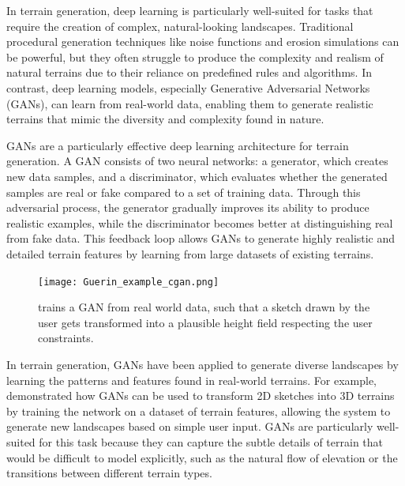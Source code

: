 

In terrain generation, deep learning is particularly well-suited for tasks that require the creation of complex, natural-looking landscapes. Traditional procedural generation techniques like noise functions and erosion simulations can be powerful, but they often struggle to produce the complexity and realism of natural terrains due to their reliance on predefined rules and algorithms. In contrast, deep learning models, especially Generative Adversarial Networks (GANs), can learn from real-world data, enabling them to generate realistic terrains that mimic the diversity and complexity found in nature.

GANs are a particularly effective deep learning architecture for terrain generation. A GAN consists of two neural networks: a generator, which creates new data samples, and a discriminator, which evaluates whether the generated samples are real or fake compared to a set of training data. Through this adversarial process, the generator gradually improves its ability to produce realistic examples, while the discriminator becomes better at distinguishing real from fake data. This feedback loop allows GANs to generate highly realistic and detailed terrain features by learning from large datasets of existing terrains.

\begin{figure}
    \texttt{[image: Guerin\_example\_cgan.png]}
    \caption{\cite{Guerin2017} trains a GAN from real world data, such that a sketch drawn by the user gets transformed into a plausible height field respecting the user constraints.}
    \label{fig:coral-island_Guerin2017-example}
\end{figure}

In terrain generation, GANs have been applied to generate diverse landscapes by learning the patterns and features found in real-world terrains. For example, \citep{Guerin2017} demonstrated how GANs can be used to transform 2D sketches into 3D terrains by training the network on a dataset of terrain features, allowing the system to generate new landscapes based on simple user input. GANs are particularly well-suited for this task because they can capture the subtle details of terrain that would be difficult to model explicitly, such as the natural flow of elevation or the transitions between different terrain types.


